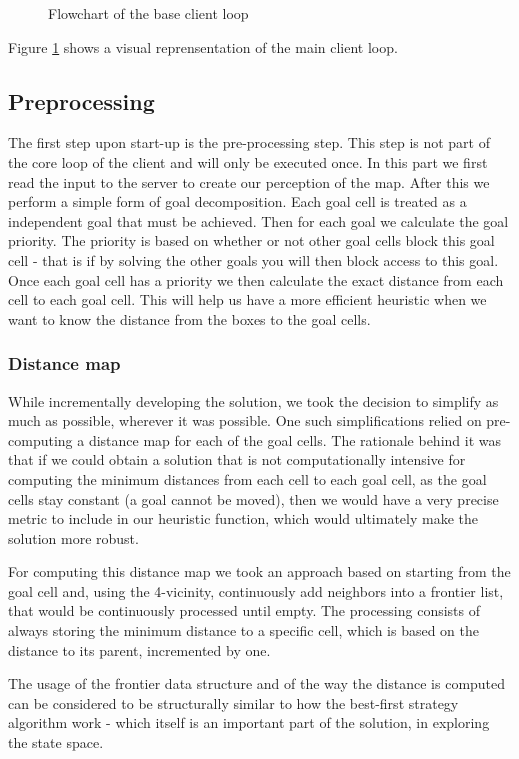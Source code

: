 \documentclass[letterpaper]{article}
\begin{document}
\begin{figure}[!htb]
\caption{Flowchart of the base client loop}
\label{fig:clientFlowchart}
\end{figure}

Figure \ref{fig:clientFlowchart} shows a visual reprensentation of the main client loop.

\subsection{Preprocessing}
The first step upon start-up is the pre-processing step. This step is not part of the core loop of the client and will only be executed once. In this part we first read the input to the server to create our perception of the map. After this we perform a simple form of goal decomposition. Each goal cell is treated as a independent goal that must be achieved. Then for each goal we calculate the goal priority. The priority is based on whether or not other goal cells block this goal cell - that is if by solving the other goals you will then block access to this goal. Once each goal cell has a priority we then calculate the exact distance from each cell to each goal cell. This will help us have a more efficient heuristic when we want to know the distance from the boxes to the goal cells.

\subsubsection{Distance map}

While incrementally developing the solution, we took the decision to simplify as much as possible, wherever it was possible. One such simplifications relied on pre-computing a distance map for each of the goal cells. The rationale behind it was that if we could obtain a solution that is not computationally intensive for computing the minimum distances from each cell to each goal cell, as the goal cells stay constant (a goal cannot be moved), then we would have a very precise metric to include in our heuristic function, which would ultimately make the solution more robust.

For computing this distance map we took an approach based on starting from the goal cell and, using the 4-vicinity, continuously add neighbors into a frontier list, that would be continuously processed until empty. The processing consists of always storing the minimum distance to a specific cell, which is based on the distance to its parent, incremented by one.

The usage of the frontier data structure and of the way the distance is computed can be considered to be structurally similar to how the best-first strategy algorithm work - which itself is an important part of the solution, in exploring the state space.
\end{document}
